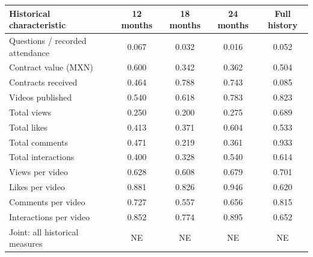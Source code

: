 \begingroup\small
\setlength{\tabcolsep}{3pt}
\renewcommand{\arraystretch}{1.25}
\noindent%
\begin{tabular*}{\linewidth}{@{\extracolsep{\fill}}lcccc@{}}
\toprule
Historical characteristic & 12 months & 18 months & 24 months & Full history \\
\midrule
Questions / recorded attendance & 0.067 & 0.032 & 0.016 & 0.052 \\
\addlinespace
Contract value (MXN) & 0.600 & 0.342 & 0.362 & 0.504 \\
Contracts received & 0.464 & 0.788 & 0.743 & 0.085 \\
\addlinespace
Videos published & 0.540 & 0.618 & 0.783 & 0.823 \\
Total views & 0.250 & 0.200 & 0.275 & 0.689 \\
Total likes & 0.413 & 0.371 & 0.604 & 0.533 \\
Total comments & 0.471 & 0.219 & 0.361 & 0.933 \\
Total interactions & 0.400 & 0.328 & 0.540 & 0.614 \\
Views per video & 0.628 & 0.608 & 0.679 & 0.701 \\
Likes per video & 0.881 & 0.826 & 0.946 & 0.620 \\
Comments per video & 0.727 & 0.557 & 0.656 & 0.815 \\
Interactions per video & 0.852 & 0.774 & 0.895 & 0.652 \\
\midrule
Joint: all historical measures & NE & NE & NE & NE \\
\bottomrule
\end{tabular*}\par\endgroup
